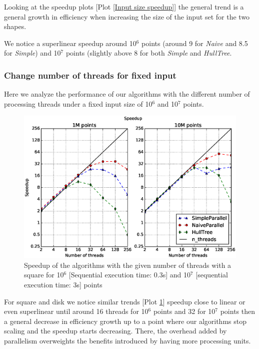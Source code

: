 \documentclass[letterpaper]{article}
\begin{document}
Looking at the speedup plots [Plot \ref{Input size speedup}] the general trend is a general growth in efficiency when increasing the size of the input set for the two shapes.

We notice a superlinear speedup around 10$^6$ points (around 9 for \textit{Naive} and 8.5 for \textit{Simple}) and 10$^7$ points (slightly above 8 for both \textit{Simple} and \textit{HullTree}.

\subsubsection{Change number of threads for fixed input}

Here we analyze the performance of our algorithms with the different number of processing threads under a fixed input size of 10$^6$ and 10$^7$ points.

\begin{figure}[!ht]\centering
  \includegraphics[scale=0.33]{./plots/speedup_xeon_square_fixed_points.eps}
  \caption{Speedup of the algorithms with the given number of threads with a square for 10$^6$ [Sequential execution time: 0.3s] and 10$^7$ [sequential execution time: 3s] points\label{Threads speedup square}}
\end{figure}

For square and disk we notice similar trends [Plot \ref{Threads speedup square}] speedup close to linear or even superlinear until around 16 threads for 10$^6$ points and 32 for 10$^7$ points then a general decrease in efficiency growth up to a point where our algorithms stop scaling and the speedup starts decreasing.
There, the overhead added by parallelism overweights the benefits introduced by having more processing units.
\end{document}
